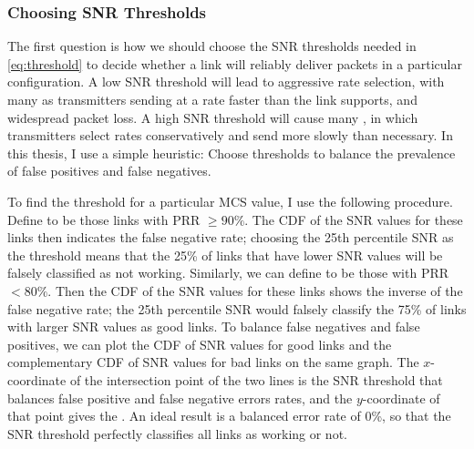 \subsubsection{Choosing SNR Thresholds}
The first question is how we should choose the SNR thresholds needed in \eqref{eq:threshold} to decide whether a link will reliably deliver packets in a particular configuration. A low SNR threshold will lead to aggressive rate selection, with many  as transmitters sending at a rate faster than the link supports, and widespread packet loss. A high SNR threshold will cause many , in which transmitters select rates conservatively and send more slowly than necessary. In this thesis, I use a simple heuristic: Choose thresholds to balance the prevalence of false positives and false negatives.

To find the threshold for a particular MCS value, I use the following procedure. Define  to be those links with PRR $\geq$$90\%$. The CDF of the SNR values for these links then indicates the false negative rate; choosing the 25th percentile SNR as the threshold means that the 25\% of links that have lower SNR values will be falsely classified as not working. Similarly, we can define  to be those with PRR $<$$80\%$. Then the CDF of the SNR values for these links shows the inverse of the false negative rate; the 25th percentile SNR would falsely classify the 75\% of links with larger SNR values as good links. To balance false negatives and false positives, we can plot the CDF of SNR values for good links and the complementary CDF of SNR values for bad links on the same graph. The $x$-coordinate of the intersection point of the two lines is the SNR threshold that balances false positive and false negative errors rates, and the $y$-coordinate of that point gives the . An ideal result is a balanced error rate of 0\%, so that the SNR threshold perfectly classifies all links as working or not.


